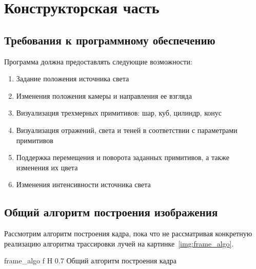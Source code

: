 
\chapter{Конструкторская часть}

\section{Требования к программному обеспечению}
Программа должна предоставлять следующие возможности:
\begin{enumerate}
	\item Задание положения источника света
	\item Изменения положения камеры и направления ее взгляда
	\item Визуализация трехмерных примитивов: шар, куб, цилиндр, конус
	\item Визуализация отражений, света и теней в соответствии с параметрами примитивов
	\item Поддержка перемещения и поворота заданных примитивов, а также изменения их цвета
	\item Изменения интенсивности источника света
\end{enumerate}

\section{Общий алгоритм построения изображения}
Рассмотрим алгоритм построения кадра, пока что не рассматривая конкретную реализацию алгоритма трассировки лучей на картинке~\ref{img:frame_algo}.




{frame_algo} %
{f} %
{H} %
{0.7\textwidth} %
{Общий алгоритм построения кадра} %




